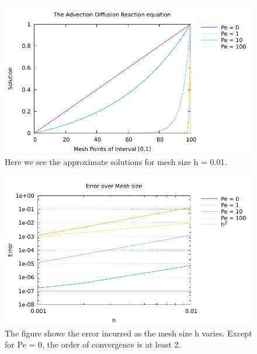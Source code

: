 \documentclass[10pt]{article}
\begin{document}
 \begin{figure}
 \begin{center}
    \includegraphics[width=1\textwidth]{function_100}
  \end{center}
  \caption{Here we see the approximate solutions for mesh size h = 0.01.
  \label{fig:func2}}
\end{figure}

 \begin{figure}
 \begin{center}
    \includegraphics[width=1\textwidth]{error}
  \end{center}
  \caption{The figure shows the error incurred as the mesh size h varies. Except for Pe = 0, the order of convergence is at least 2.
  \label{fig:func2}}
\end{figure}
\end{document}
